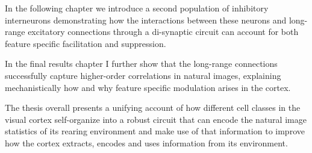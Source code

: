 In the following chapter we introduce a second population of
inhibitory interneurons demonstrating how the interactions between
these neurons and long-range excitatory connections through a
di-synaptic circuit can account for both feature specific facilitation
and suppression.

In the final results chapter I further show that the long-range
connections successfully capture higher-order correlations in natural
images, explaining mechanistically how and why feature specific
modulation arises in the cortex.

The thesis overall presents a unifying account of how different cell
classes in the visual cortex self-organize into a robust circuit that
can encode the natural image statistics of its rearing environment and
make use of that information to improve how the cortex extracts,
encodes and uses information from its environment.
